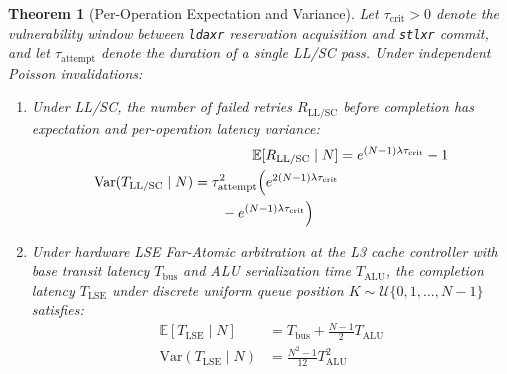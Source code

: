 \documentclass[conference]{IEEEtran}
\newtheorem{theorem}{Theorem}
\begin{document}
\begin{theorem}[Per-Operation Expectation and Variance]
Let $\tau_{\text{crit}} > 0$ denote the vulnerability window between \texttt{ldaxr} reservation acquisition and \texttt{stlxr} commit, and let $\tau_{\text{attempt}}$ denote the duration of a single LL/SC pass. Under independent Poisson invalidations:
\begin{enumerate}
    \item Under LL/SC, the number of failed retries $R_{\text{LL/SC}}$ before completion has expectation and per-operation latency variance:
    \begin{align}
        \mathbb{E}[R_{\text{LL/SC}} \mid N] &= e^{(N-1)\lambda \tau_{\text{crit}}} - 1 \label{eq:llsc_mean} \\
        \begin{split}
        \mathrm{Var}(T_{\text{LL/SC}} \mid N) &= \tau_{\text{attempt}}^2 \Bigl(e^{2(N-1)\lambda \tau_{\text{crit}}} \\
        &\qquad - e^{(N-1)\lambda \tau_{\text{crit}}}\Bigr)
        \end{split} \label{eq:llsc_var}
    \end{align}
    \item Under hardware LSE Far-Atomic arbitration at the L3 cache controller with base transit latency $T_{\text{bus}}$ and ALU serialization time $T_{\text{ALU}}$, the completion latency $T_{\text{LSE}}$ under discrete uniform queue position $K \sim \mathcal{U}\{0, 1, \dots, N-1\}$ satisfies:
    \begin{align}
        \mathbb{E}[T_{\text{LSE}} \mid N] &= T_{\text{bus}} + \frac{N-1}{2} T_{\text{ALU}} \label{eq:lse_mean} \\
        \mathrm{Var}(T_{\text{LSE}} \mid N) &= \frac{N^2 - 1}{12} T_{\text{ALU}}^2 \label{eq:lse_var}
    \end{align}
\end{enumerate}
\end{theorem}
\end{document}
